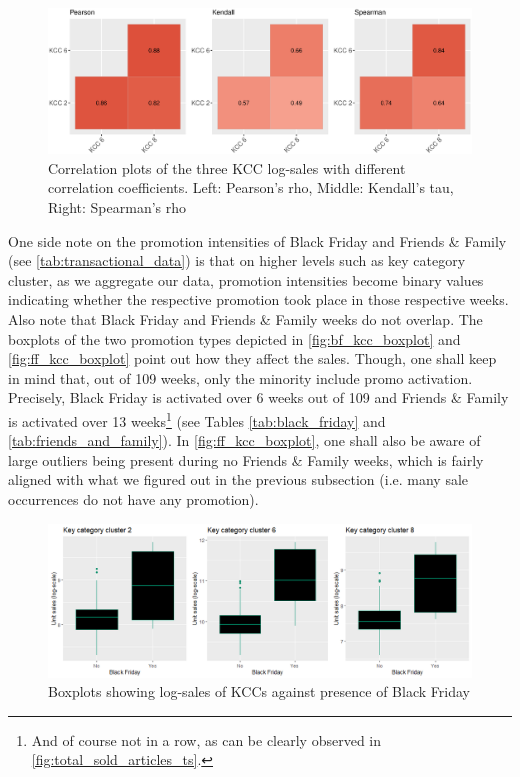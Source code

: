 \begin{figure}[H]
\centering
  \includegraphics[width=0.95\linewidth]{figures/corplot_kcc.eps}
  \caption{Correlation plots of the three \ac{KCC} log-sales with different correlation coefficients. Left: Pearson's rho, Middle: Kendall's tau, Right: Spearman's rho}
  \label{fig:corplot_kcc}
\end{figure}




One side note on the promotion intensities of Black Friday and Friends \& Family (see \autoref{tab:transactional_data}) is that on higher levels such as key category cluster, as we aggregate our data, promotion intensities become binary values indicating whether the respective promotion took place in those respective weeks. Also note that Black Friday and Friends \& Family weeks do not overlap. The boxplots of the two promotion types depicted in \autoref{fig:bf_kcc_boxplot} and \autoref{fig:ff_kcc_boxplot} point out how they affect the sales. Though, one shall keep in mind that, out of 109 weeks, only the minority include promo activation. Precisely, Black Friday is activated over 6 weeks out of 109 and Friends \& Family is activated over 13 weeks\footnote{And of course not in a row, as can be clearly observed in \autoref{fig:total_sold_articles_ts}.} (see Tables \ref{tab:black_friday} and \ref{tab:friends_and_family}). In \autoref{fig:ff_kcc_boxplot}, one shall also be aware of large outliers being present during no Friends \& Family weeks, which is fairly aligned with what we figured out in the previous subsection (i.e. many sale occurrences do not have any promotion).
\\


\begin{figure}[H]
\centering
  \includegraphics[width=0.95\linewidth]{figures/bf_kcc_boxplot.png}
  \caption{Boxplots showing log-sales of KCCs against presence of Black Friday}
  \label{fig:bf_kcc_boxplot}
\end{figure}



